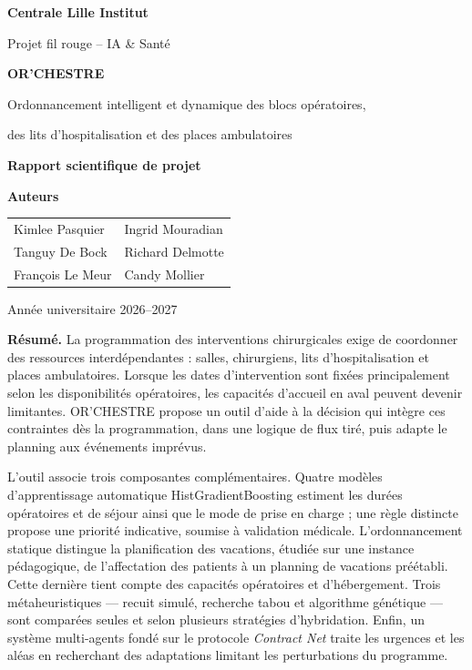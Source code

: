 \documentclass[11pt,a4paper]{article}
\begin{document}
\begin{titlepage}
\begin{center}
\vspace*{1.3cm}
{\Large\textbf{Centrale Lille Institut}\par}
\vspace{0.35cm}
{\large Projet fil rouge -- IA \& Santé\par}
\vspace{1.75cm}
{\Huge\textbf{OR'CHESTRE}\par}
\vspace{0.65cm}
{\Large Ordonnancement intelligent et dynamique des blocs opératoires,\par
 des lits d'hospitalisation et des places ambulatoires\par}
\vspace{1.75cm}
{\large\textbf{Rapport scientifique de projet}\par}
\vspace{1.45cm}
{\large\textbf{Auteurs}\par}
\vspace{0.6cm}
\begin{tabular}{ll}
Kimlee Pasquier & Ingrid Mouradian\\[0.35cm]
Tanguy De Bock & Richard Delmotte\\[0.35cm]
François Le Meur & Candy Mollier
\end{tabular}
\vspace{0.7cm}

\vfill
{\large Année universitaire 2026--2027\par}
\end{center}
\end{titlepage}


\noindent\textbf{Résumé.}
La programmation des interventions chirurgicales exige de coordonner des ressources interdépendantes : salles, chirurgiens, lits d'hospitalisation et places ambulatoires. Lorsque les dates d'intervention sont fixées principalement selon les disponibilités opératoires, les capacités d'accueil en aval peuvent devenir limitantes. OR'CHESTRE propose un outil d'aide à la décision qui intègre ces contraintes dès la programmation, dans une logique de flux tiré, puis adapte le planning aux événements imprévus.

L'outil associe trois composantes complémentaires. Quatre modèles d'apprentissage automatique HistGradientBoosting estiment les durées opératoires et de séjour ainsi que le mode de prise en charge ; une règle distincte propose une priorité indicative, soumise à validation médicale. L'ordonnancement statique distingue la planification des vacations, étudiée sur une instance pédagogique, de l'affectation des patients à un planning de vacations préétabli. Cette dernière tient compte des capacités opératoires et d'hébergement. Trois métaheuristiques --- recuit simulé, recherche tabou et algorithme génétique --- sont comparées seules et selon plusieurs stratégies d'hybridation. Enfin, un système multi-agents fondé sur le protocole \emph{Contract Net} traite les urgences et les aléas en recherchant des adaptations limitant les perturbations du programme.
\end{document}
